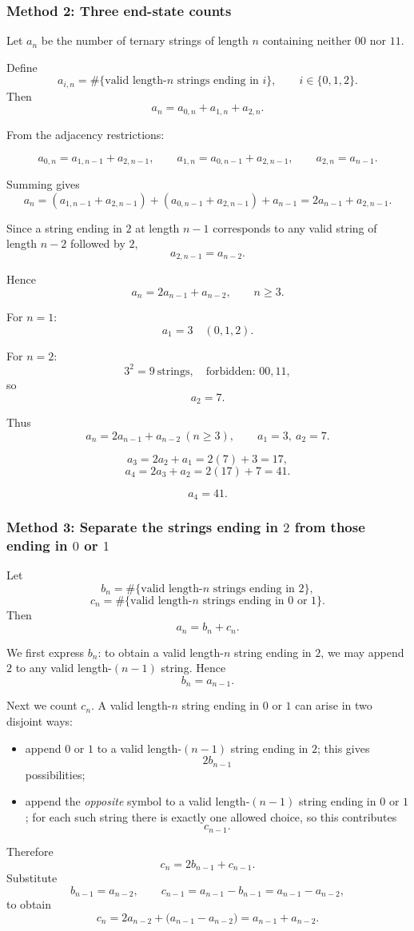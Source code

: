 \documentclass[12pt]{article}
\begin{document}
\subsubsection*{Method 2: Three end-state counts}

Let $a_n$ be the number of ternary strings of length $n$ containing neither $00$ nor $11$.

Define
\[
a_{i,n}=\#\{\text{valid length-}n\text{ strings ending in }i\},\qquad i\in\{0,1,2\}.
\]
Then
\[
a_n=a_{0,n}+a_{1,n}+a_{2,n}.
\]

From the adjacency restrictions:

\[
a_{0,n}=a_{1,n-1}+a_{2,n-1},\qquad
a_{1,n}=a_{0,n-1}+a_{2,n-1},\qquad
a_{2,n}=a_{n-1}.
\]

Summing gives
\[
a_n=(a_{1,n-1}+a_{2,n-1})+(a_{0,n-1}+a_{2,n-1})+a_{n-1}
=2a_{n-1}+a_{2,n-1}.
\]

Since a string ending in $2$ at length $n-1$ corresponds to any valid string of length $n-2$ followed by $2$,
\[
a_{2,n-1}=a_{n-2}.
\]

Hence
\[
\boxed{a_n=2a_{n-1}+a_{n-2}},\qquad n\ge3.
\]

For $n=1$:
\[
a_1=3 \quad (0,1,2).
\]

For $n=2$:
\[
3^2=9\ \text{strings},\quad \text{forbidden: }00,11,
\]
so
\[
a_2=7.
\]

Thus
\[
\boxed{a_n=2a_{n-1}+a_{n-2}\ (n\ge3),\qquad a_1=3,\ a_2=7.}
\]

\[
a_3=2a_2+a_1=2(7)+3=17,
\]
\[
a_4=2a_3+a_2=2(17)+7=41.
\]

\[
\boxed{a_4=41.}
\]
\subsubsection*{Method 3: Separate the strings ending in $2$ from those ending in $0$ or $1$}
Let
\[
b_n=\#\{\text{valid length-}n\text{ strings ending in }2\},
\]
\[
c_n=\#\{\text{valid length-}n\text{ strings ending in }0\text{ or }1\}.
\]
Then
\[
a_n=b_n+c_n.
\]

We first express $b_n$:
to obtain a valid length-$n$ string ending in $2$, we may append $2$ to any valid length-$(n-1)$ string. Hence
\[
b_n=a_{n-1}.
\]

Next we count $c_n$.
A valid length-$n$ string ending in $0$ or $1$ can arise in two disjoint ways:
\begin{itemize}[leftmargin=*]
  \item append $0$ or $1$ to a valid length-$(n-1)$ string ending in $2$; this gives
  \[
  2b_{n-1}
  \]
  possibilities;
  \item append the \emph{opposite} symbol to a valid length-$(n-1)$ string ending in $0$ or $1$; for each such string there is exactly one allowed choice, so this contributes
  \[
  c_{n-1}.
  \]
\end{itemize}
Therefore
\[
c_n=2b_{n-1}+c_{n-1}.
\]
Substitute
\[
b_{n-1}=a_{n-2}, \qquad c_{n-1}=a_{n-1}-b_{n-1}=a_{n-1}-a_{n-2},
\]
to obtain
\[
c_n=2a_{n-2}+\bigl(a_{n-1}-a_{n-2}\bigr)=a_{n-1}+a_{n-2}.
\]
\end{document}
